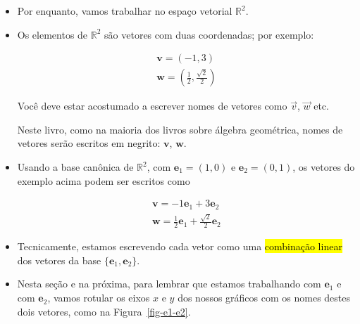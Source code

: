\documentclass[
  letterpaper,
  DIV=11,
  numbers=noendperiod]{scrreprt}
\begin{document}
\begin{itemize}
\item
  Por enquanto, vamos trabalhar no espaço vetorial $\mathbb{R}^2$.
\item
  Os elementos de $\mathbb{R}^2$ são vetores com duas coordenadas; por
  exemplo:

  \[
  \begin{array}{l}
    \mathbf{v} = (-1, 3)\\
    \mathbf{w} = \left( \frac12, \frac{\sqrt{2}}{2} \right)
  \end{array}
  \]

  \begin{tcolorbox}[standard jigsaw,toprule=.15mm, bottomrule=.15mm, bottomtitle=1mm, opacityback=0, coltitle=black, toptitle=1mm, title=\textcolor{quarto-callout-warning-color}{\faExclamationTriangle}\hspace{0.5em}{Notação: vetores em negrito}, opacitybacktitle=0.6, left=2mm, titlerule=0mm, arc=.35mm, colbacktitle=quarto-callout-warning-color!10!white, colback=white, rightrule=.15mm, leftrule=.75mm, colframe=quarto-callout-warning-color-frame]
  Você deve estar acostumado a escrever nomes de vetores como $\vec v$,
  $\vec w$ etc.

  Neste livro, como na maioria dos livros sobre álgebra geométrica,
  nomes de vetores serão escritos em negrito: $\mathbf{v}$,
  $\mathbf{w}$.
  \end{tcolorbox}
\item
  Usando a base canônica de $\mathbb{R}^2$, com
  $\mathbf{e}_{1} = (1, 0)$ e $\mathbf{e}_{2} = (0, 1)$, os vetores do
  exemplo acima podem ser escritos como

  \[
  \begin{array}{l}
    \mathbf{v} = -1\mathbf{e}_{1} + 3\mathbf{e}_{2}\\
    \mathbf{w} = \frac12 \mathbf{e}_{1} + \frac{\sqrt{2}}{2}\mathbf{e}_{2}
  \end{array}
  \]
\item
  Tecnicamente, estamos escrevendo cada vetor como uma {\hl{combinação
  linear}} dos vetores da base $\{ \mathbf{e}_{1}, \mathbf{e}_{2} \}$.
\item
  Nesta seção e na próxima, para lembrar que estamos trabalhando com
  $\mathbf{e}_{1}$ e com $\mathbf{e}_{2}$, vamos rotular os eixos $x$ e
  $y$ dos nossos gráficos com os nomes destes dois vetores, como na
  Figura~\ref{fig-e1-e2}.

  \begin{figure}[t]


\end{figure}
\end{itemize}
\end{document}
